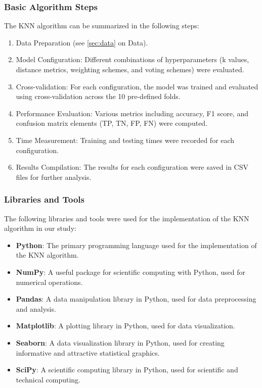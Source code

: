 \subsubsection*{Basic Algorithm Steps}
The KNN algorithm can be summarized in the following steps:
\begin{enumerate}
    \item Data Preparation (see \autoref{sec:data} on Data).
    \item Model Configuration: Different combinations of hyperparameters (k values, distance metrics, weighting schemes, and voting schemes) were evaluated.
    \item Cross-validation: For each configuration, the model was trained and evaluated using cross-validation across the 10 pre-defined folds.
    \item Performance Evaluation: Various metrics including accuracy, F1 score, and confusion matrix elements (TP, TN, FP, FN) were computed.
    \item Time Measurement: Training and testing times were recorded for each configuration.
    \item Results Compilation: The results for each configuration were saved in CSV files for further analysis.
\end{enumerate}

\subsubsection*{Libraries and Tools}
The following libraries and tools were used for the implementation of the KNN algorithm in our study:

\begin{itemize}
    \item \textbf{Python}: The primary programming language used for the implementation of the KNN algorithm.
    \item \textbf{NumPy}: A useful package for scientific computing with Python, used for numerical operations.
    \item \textbf{Pandas}: A data manipulation library in Python, used for data preprocessing and analysis.
    \item \textbf{Matplotlib}: A plotting library in Python, used for data visualization.
    \item \textbf{Seaborn}: A data visualization library in Python, used for creating informative and attractive statistical graphics.
    \item \textbf{SciPy}: A scientific computing library in Python, used for scientific and technical computing.
\end{itemize}

